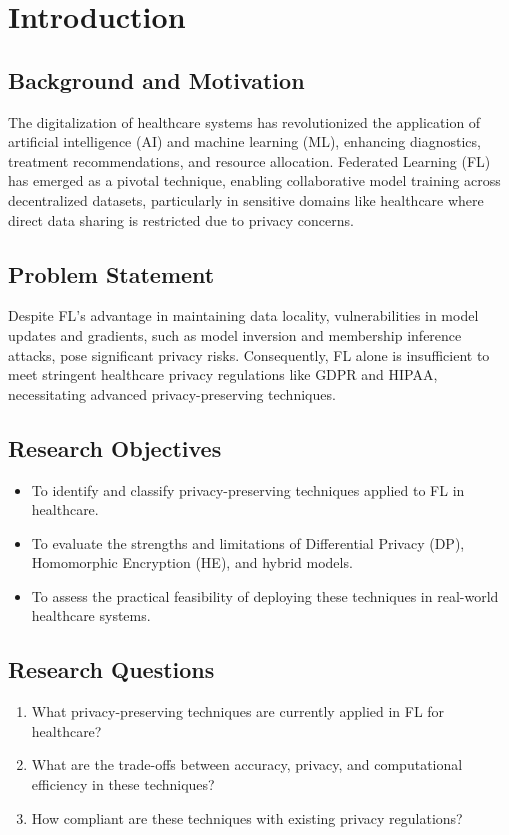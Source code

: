 \documentclass[12pt]{report}
\begin{document}
\chapter{Introduction}

\section{Background and Motivation}
The digitalization of healthcare systems has revolutionized the application of artificial intelligence (AI) and machine learning (ML), enhancing diagnostics, treatment recommendations, and resource allocation. Federated Learning (FL) has emerged as a pivotal technique, enabling collaborative model training across decentralized datasets, particularly in sensitive domains like healthcare where direct data sharing is restricted due to privacy concerns.

\section{Problem Statement}
Despite FL's advantage in maintaining data locality, vulnerabilities in model updates and gradients, such as model inversion and membership inference attacks, pose significant privacy risks. Consequently, FL alone is insufficient to meet stringent healthcare privacy regulations like GDPR and HIPAA, necessitating advanced privacy-preserving techniques.

\section{Research Objectives}
\begin{itemize}
    \item To identify and classify privacy-preserving techniques applied to FL in healthcare.
    \item To evaluate the strengths and limitations of Differential Privacy (DP), Homomorphic Encryption (HE), and hybrid models.
    \item To assess the practical feasibility of deploying these techniques in real-world healthcare systems.
\end{itemize}

\section{Research Questions}
\begin{enumerate}
    \item What privacy-preserving techniques are currently applied in FL for healthcare?
    \item What are the trade-offs between accuracy, privacy, and computational efficiency in these techniques?
    \item How compliant are these techniques with existing privacy regulations?
\end{enumerate}
\end{document}
